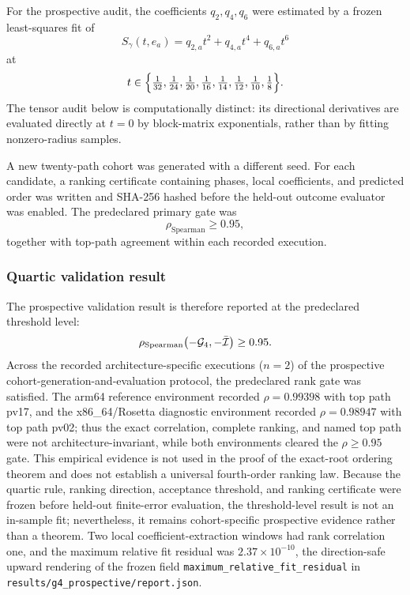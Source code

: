 For the prospective audit, the coefficients $q_{2},q_{4},q_{6}$ were estimated by a frozen
least-squares fit of
\[
S_{\gamma}(t,e_{a})=q_{2,a}t^{2}+q_{4,a}t^{4}+q_{6,a}t^{6}
\]
at
\[
t\in\Bigl\{\tfrac{1}{32},\tfrac{1}{24},\tfrac{1}{20},\tfrac{1}{16},
\tfrac{1}{14},\tfrac{1}{12},\tfrac{1}{10},\tfrac{1}{8}\Bigr\}.
\]
The tensor audit below is computationally distinct: its directional derivatives are
evaluated directly at $t=0$ by block-matrix exponentials, rather than by fitting
nonzero-radius samples.

A new twenty-path cohort was generated with a different seed. For each candidate, a ranking
certificate containing phases, local coefficients, and predicted order was written and
SHA-256 hashed before the held-out outcome evaluator was enabled. The predeclared primary
gate was
\[
\rho_{\mathrm{Spearman}}\ge 0.95,
\]
together with top-path agreement within each recorded execution.

\subsubsection{Quartic validation result}

The prospective validation result is therefore reported at the predeclared threshold level:
\begin{equation}\label{eq:spearman}
\rho_{\mathrm{Spearman}}\bigl(-\mathcal{G}_{4},-\bar{\mathcal{I}}\bigr)\ge0.95.
\end{equation}
Across the recorded architecture-specific executions ($n=2$) of the prospective
cohort-generation-and-evaluation protocol, the predeclared rank gate was satisfied. The
arm64 reference environment recorded $\rho=0.99398$ with top path pv17, and the
x86\_64/Rosetta diagnostic environment recorded $\rho=0.98947$ with top path pv02; thus the
exact correlation, complete ranking, and named top path were not architecture-invariant,
while both environments cleared the $\rho\ge0.95$ gate. This empirical evidence is not
used in the proof of the exact-root ordering theorem and does not establish a universal
fourth-order ranking law. Because the quartic rule, ranking direction, acceptance threshold,
and ranking certificate were frozen before held-out finite-error evaluation, the
threshold-level result is not an in-sample fit; nevertheless, it remains cohort-specific
prospective evidence rather than a theorem. Two local coefficient-extraction windows had
rank correlation one, and the maximum relative fit residual was $2.37\times10^{-10}$, the
direction-safe upward rendering of the frozen field
\texttt{maximum\_relative\_fit\_residual} in \texttt{results/g4\_prospective/report.json}.

